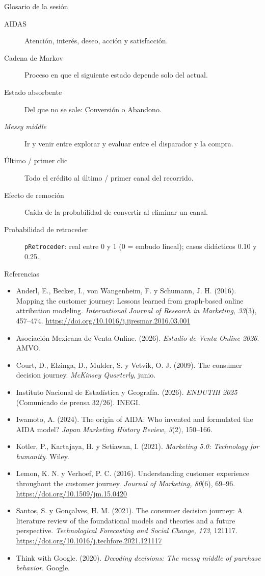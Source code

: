 \documentclass[aspectratio=169,xcolor=dvipsnames]{beamer}
\begin{document}
\begin{frame}{Glosario de la sesión}
\scriptsize
\begin{description}
  \item[AIDAS] Atención, interés, deseo, acción y satisfacción.
  \item[Cadena de Markov] Proceso en que el siguiente estado depende solo del actual.
  \item[Estado absorbente] Del que no se sale: Conversión o Abandono.
  \item[\textit{Messy middle}] Ir y venir entre explorar y evaluar entre el disparador y la compra.
  \item[Último / primer clic] Todo el crédito al último / primer canal del recorrido.
  \item[Efecto de remoción] Caída de la probabilidad de convertir al eliminar un canal.
  \item[Probabilidad de retroceder] \texttt{pRetroceder}: real entre 0 y 1 (0 = embudo lineal); casos didácticos 0.10 y 0.25.
\end{description}
\end{frame}

\begin{frame}{Referencias}
\tiny
\begin{itemize}
  \item[] Anderl, E., Becker, I., von Wangenheim, F. y Schumann, J. H. (2016). Mapping the customer journey: Lessons learned from graph-based online attribution modeling. \textit{International Journal of Research in Marketing, 33}(3), 457--474. \url{https://doi.org/10.1016/j.ijresmar.2016.03.001}
  \item[] Asociación Mexicana de Venta Online. (2026). \textit{Estudio de Venta Online 2026}. AMVO.
  \item[] Court, D., Elzinga, D., Mulder, S. y Vetvik, O. J. (2009). The consumer decision journey. \textit{McKinsey Quarterly}, junio.
  \item[] Instituto Nacional de Estadística y Geografía. (2026). \textit{ENDUTIH 2025} (Comunicado de prensa 32/26). INEGI.
  \item[] Iwamoto, A. (2024). The origin of AIDA: Who invented and formulated the AIDA model? \textit{Japan Marketing History Review, 3}(2), 150--166.
  \item[] Kotler, P., Kartajaya, H. y Setiawan, I. (2021). \textit{Marketing 5.0: Technology for humanity}. Wiley.
  \item[] Lemon, K. N. y Verhoef, P. C. (2016). Understanding customer experience throughout the customer journey. \textit{Journal of Marketing, 80}(6), 69--96. \url{https://doi.org/10.1509/jm.15.0420}
  \item[] Santos, S. y Gonçalves, H. M. (2021). The consumer decision journey: A literature review of the foundational models and theories and a future perspective. \textit{Technological Forecasting and Social Change, 173}, 121117. \url{https://doi.org/10.1016/j.techfore.2021.121117}
  \item[] Think with Google. (2020). \textit{Decoding decisions: The messy middle of purchase behavior}. Google.
\end{itemize}
\end{frame}
\end{document}
